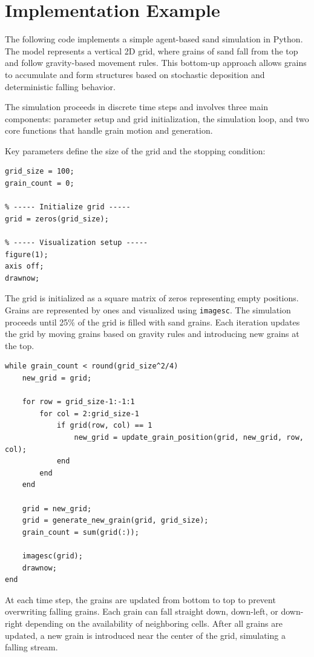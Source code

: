\documentclass{article}
\begin{document}
\section{Implementation Example}
The following code implements a simple agent-based sand simulation in Python. The model represents a vertical 2D grid, where grains of sand fall from the top and follow gravity-based movement rules. This bottom-up approach allows grains to accumulate and form structures based on stochastic deposition and deterministic falling behavior.

The simulation proceeds in discrete time steps and involves three main components: parameter setup and grid initialization, the simulation loop, and two core functions that handle grain motion and generation.

Key parameters define the size of the grid and the stopping condition:

\begin{lstlisting}[caption={Parameters and Initialization}]
% ----- Parameters -----
grid_size = 100;
grain_count = 0;

% ----- Initialize grid -----
grid = zeros(grid_size);

% ----- Visualization setup -----
figure(1);
axis off;
drawnow;
\end{lstlisting}

The grid is initialized as a square matrix of zeros representing empty positions. Grains are represented by ones and visualized using \texttt{imagesc}. The simulation proceeds until 25\% of the grid is filled with sand grains. Each iteration updates the grid by moving grains based on gravity rules and introducing new grains at the top.

\begin{lstlisting}[caption={Simulation loop}]
while grain_count < round(grid_size^2/4)
    new_grid = grid;

    for row = grid_size-1:-1:1
        for col = 2:grid_size-1
            if grid(row, col) == 1
                new_grid = update_grain_position(grid, new_grid, row, col);
            end
        end
    end

    grid = new_grid;
    grid = generate_new_grain(grid, grid_size);
    grain_count = sum(grid(:));

    imagesc(grid);
    drawnow;
end
\end{lstlisting}

At each time step, the grains are updated from bottom to top to prevent overwriting falling grains. Each grain can fall straight down, down-left, or down-right depending on the availability of neighboring cells. After all grains are updated, a new grain is introduced near the center of the grid, simulating a falling stream.
\end{document}
